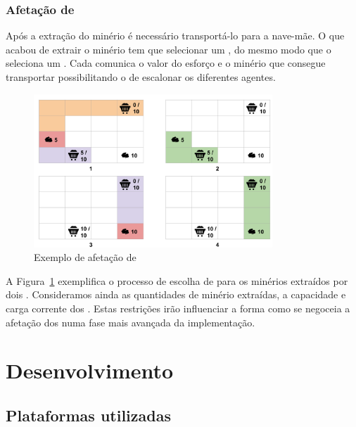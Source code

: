 \documentclass[12pt]{report}
\begin{document}
\FloatBarrier
\subsection{Afetação de \transporters}
Após a extração do minério é necessário transportá-lo para a nave-mãe. 
O \producer que acabou de extrair o minério tem que selecionar um \transporter, do mesmo modo que o \spotter seleciona um \producer. 
Cada \transporter comunica o valor do esforço e o minério que consegue transportar possibilitando o \producer de escalonar os diferentes agentes.

\begin{figure}[h]
	\centering
    \includegraphics[width=0.8\textwidth]{transporter-scheduling}
	\caption{Exemplo de afetação de \transporters}
	\label{transporter-scheduling}
\end{figure}

A Figura~\ref{transporter-scheduling} exemplifica o processo de escolha de \transporters para os minérios extraídos por dois \producers. Consideramos ainda as quantidades de minério extraídas, a capacidade e carga corrente dos \transporters. Estas restrições irão influenciar a forma como se negoceia a afetação dos \transporters numa fase mais avançada da implementação.


\chapter{Desenvolvimento}


\section{Plataformas utilizadas}
\end{document}
